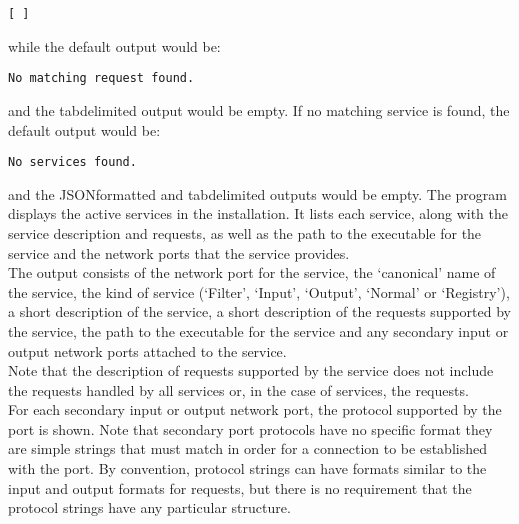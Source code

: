 \outputBegin{}
\begin{verbatim}
[ ]
\end{verbatim}
\outputEnd{}
\condPage{}
while the default output would be:
\outputBegin{}
\begin{verbatim}
No matching request found.
\end{verbatim}
\outputEnd{}
and the tab\longDash{}delimited output would be empty.
If no matching service is found, the default output would be:
\outputBegin{}
\begin{verbatim}
No services found.
\end{verbatim}
\outputEnd{}
and the JSON\longDash{}formatted and tab\longDash{}delimited outputs would be empty.
The program  displays the active services in the \mplusm{}
installation.
It lists each service, along with the service description and requests, as well as the
path to the executable for the service and the \yarp{} network ports that the service
provides.\\

The output consists of the \yarp{} network port for the service, the `canonical' name of
the service, the kind of service (`Filter', `Input', `Output', `Normal' or `Registry'), a
short description of the service, a short description of the requests supported by the
service, the path to the executable for the service and any secondary input or output
\yarp{} network ports attached to the service.\\

Note that the description of requests supported by the service does not include the
 requests handled by all services or, in the case of
 services, the 
requests.\\

For each secondary input or output \yarp{} network port, the protocol supported by the
port is shown.
Note that secondary port protocols have no specific format \longDash{} they are simple
strings that must match in order for a connection to be established with the port.
By convention, protocol strings can have formats similar to the input and output formats
for requests, but there is no requirement that the protocol strings have any particular
structure.\\

